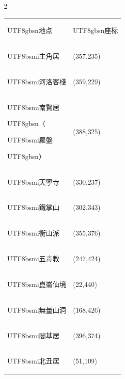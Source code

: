 \begin{paracol}{2}
{\scriptsize\begin{tabular}{@{}ll@{}}\begin{CJK}{UTF8}{gbsn}地点\end{CJK} & \begin{CJK}{UTF8}{gbsn}座标\end{CJK}\\\begin{CJK}{UTF8}{bsmi}主角居\end{CJK} & (357,235)\\\begin{CJK}{UTF8}{bsmi}河洛客棧\end{CJK} & (359,229)\\\begin{CJK}{UTF8}{bsmi}南賢居\end{CJK}\begin{CJK}{UTF8}{gbsn}（\end{CJK}\begin{CJK}{UTF8}{bsmi}羅盤\end{CJK}\begin{CJK}{UTF8}{gbsn}）\end{CJK} & (388,325)\\\begin{CJK}{UTF8}{bsmi}天寧寺\end{CJK} & (330,237)\\\begin{CJK}{UTF8}{bsmi}鐵掌山\end{CJK} & (302,343)\\\begin{CJK}{UTF8}{bsmi}衡山派\end{CJK} & (355,376)\\\begin{CJK}{UTF8}{bsmi}五毒教\end{CJK} & (247,424)\\\begin{CJK}{UTF8}{bsmi}崑崙仙境\end{CJK} & (22,440)\\\begin{CJK}{UTF8}{bsmi}無量山洞\end{CJK} & (168,426)\\\begin{CJK}{UTF8}{bsmi}閻基居\end{CJK} & (396,374)\\\begin{CJK}{UTF8}{bsmi}北丑居\end{CJK} & (51,109)\end{tabular}\par}
\end{paracol}
